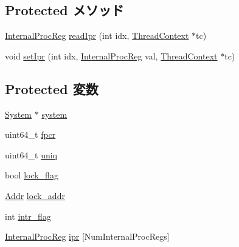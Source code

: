 \subsection*{Protected メソッド}
\begin{DoxyCompactItemize}
\item 
\hyperlink{classAlphaISA_1_1ISA_a3be59bc6c39d87f5d4bd0e05abe0b416}{InternalProcReg} \hyperlink{classAlphaISA_1_1ISA_adc7402a9cc2aaeb6bbb7bf5c3f7c4d18}{readIpr} (int idx, \hyperlink{classThreadContext}{ThreadContext} $\ast$tc)
\item 
void \hyperlink{classAlphaISA_1_1ISA_a5ad670d8483b30ac29ecc133e3e501d5}{setIpr} (int idx, \hyperlink{classAlphaISA_1_1ISA_a3be59bc6c39d87f5d4bd0e05abe0b416}{InternalProcReg} val, \hyperlink{classThreadContext}{ThreadContext} $\ast$tc)
\end{DoxyCompactItemize}
\subsection*{Protected 変数}
\begin{DoxyCompactItemize}
\item 
\hyperlink{classSystem}{System} $\ast$ \hyperlink{classAlphaISA_1_1ISA_af27ccd765f13a4b7bd119dc7579e2746}{system}
\item 
uint64\_\-t \hyperlink{classAlphaISA_1_1ISA_afe6e18a3c766bdbd3a13c449eff10c85}{fpcr}
\item 
uint64\_\-t \hyperlink{classAlphaISA_1_1ISA_a4bf79f35bed3cb9ecd35cc65ec6400c7}{uniq}
\item 
bool \hyperlink{classAlphaISA_1_1ISA_a5379df879a195cd227c4b3e04fc324d4}{lock\_\-flag}
\item 
\hyperlink{classm5_1_1params_1_1Addr}{Addr} \hyperlink{classAlphaISA_1_1ISA_a06174a765f779599487143e17e764d72}{lock\_\-addr}
\item 
int \hyperlink{classAlphaISA_1_1ISA_a132031b6f829162c4bd2effdb8105dcb}{intr\_\-flag}
\item 
\hyperlink{classAlphaISA_1_1ISA_a3be59bc6c39d87f5d4bd0e05abe0b416}{InternalProcReg} \hyperlink{classAlphaISA_1_1ISA_a73c7625b3b5159b8981319eeb1337c75}{ipr} \mbox{[}NumInternalProcRegs\mbox{]}
\end{DoxyCompactItemize}



